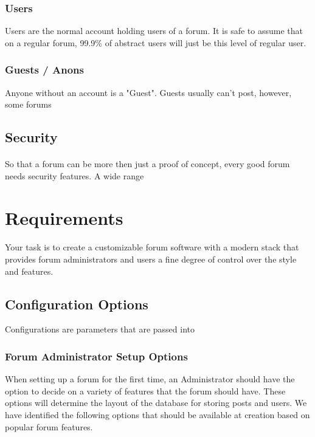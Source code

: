 \documentclass[]{article}
\begin{document}
\subsubsection{Users}
Users are the normal account holding users of a forum. It is safe to assume that on a regular forum, 99.9\% of abstract users will just be this level of regular user. 

\subsubsection{Guests / Anons}
Anyone without an account is a "Guest". Guests usually can't post, however, some forums 


\subsection{Security}
\paragraph{}
So that a forum can be more then just a proof of concept, every good forum needs security features. A wide range

\section{Requirements}
\paragraph{}
Your task is to create a customizable forum software with a modern stack that provides forum administrators and users a fine degree of control over the style and features. 

\subsection{Configuration Options}
Configurations are parameters that are passed into  

\subsubsection{Forum Administrator Setup Options}
When setting up a forum for the first time, an Administrator should have the option to decide on a variety of features that the forum should have. These options will determine the layout of the database for storing posts and users. We have identified the following options that should be available at creation based on popular forum features.
\end{document}
